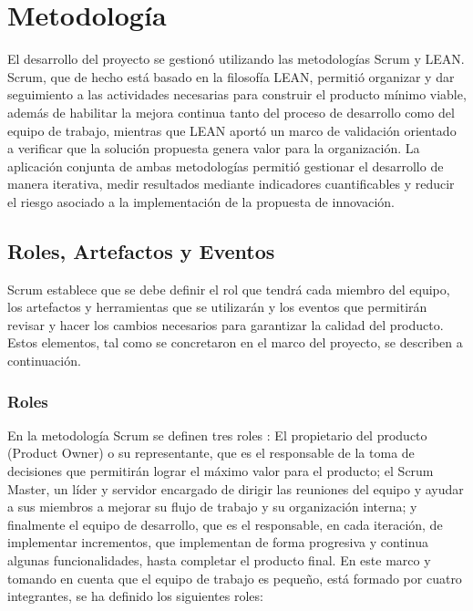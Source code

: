 \section{Metodología}\label{metodologuxeda}

El desarrollo del proyecto se gestionó utilizando las metodologías Scrum y LEAN. Scrum, que de hecho está basado en la filosofía LEAN, permitió organizar y dar seguimiento a las actividades necesarias para construir el producto mínimo viable, además de habilitar la mejora continua tanto del proceso de desarrollo como del equipo de trabajo, mientras que LEAN aportó un marco de validación orientado a verificar que la solución propuesta genera valor para la organización. La aplicación conjunta de ambas metodologías permitió gestionar el desarrollo de manera iterativa, medir resultados mediante indicadores cuantificables y reducir el riesgo asociado a la implementación de la propuesta de innovación.

\subsection{Roles, Artefactos y Eventos}\label{roles-artefactos-y-eventos}

Scrum establece que se debe definir el rol que tendrá cada miembro del equipo, los artefactos y herramientas que se utilizarán y los eventos que permitirán revisar y hacer los cambios necesarios para garantizar la calidad del producto. Estos elementos, tal como se concretaron en el marco del proyecto, se describen a continuación.

\subsubsection{Roles}\label{roles}

En la metodología Scrum se definen tres roles \citep{schwaber2020}: El propietario del producto (Product Owner) o su representante, que es el responsable de la toma de decisiones que permitirán lograr el máximo valor para el producto; el Scrum Master, un líder y servidor encargado de dirigir las reuniones del equipo y ayudar a sus miembros a mejorar su flujo de trabajo y su organización interna; y finalmente el equipo de desarrollo, que es el responsable, en cada iteración, de implementar incrementos, que implementan de forma progresiva y continua algunas funcionalidades, hasta completar el producto final. En este marco y tomando en cuenta que el equipo de trabajo es pequeño, está formado por cuatro integrantes, se ha definido los siguientes roles:

